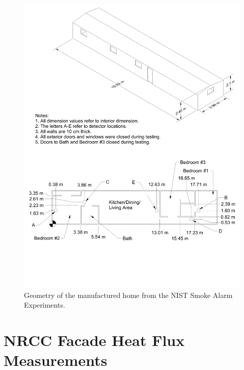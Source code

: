 \begin{figure}[p]
\includegraphics[width=\textwidth]{FIGURES/NIST_Smoke_Alarms/Manufactured_Home_Drawing}
\caption[Geometry of the manufactured home from the NIST Smoke Alarm Experiments]{Geometry of the manufactured home from the NIST Smoke Alarm Experiments.}
\label{NIST_Smoke_Alarms_Drawing}
\end{figure}


\section{NRCC Facade Heat Flux Measurements}

